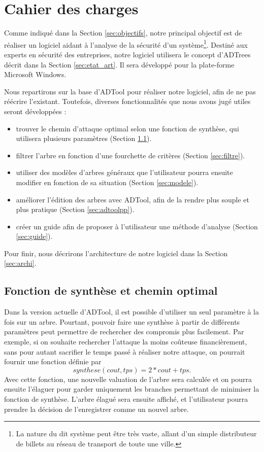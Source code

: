 \section{Cahier des charges}
    \label{sec:cahier}

    Comme indiqué dans la Section \ref{sec:objectifs}, notre principal objectif est de réaliser un logiciel aidant à l'analyse de la sécurité d'un système\footnote{La nature du dit système peut être très vaste, allant d'un simple distributeur de billets au réseau de transport de toute une ville.}. Destiné aux experts en sécurité des entreprises, notre logiciel utilisera le concept d'ADTrees décrit dans la Section \ref{sec:etat_art}. Il sera développé pour la plate-forme Microsoft Windows.

    Nous repartirons sur la base d'ADTool pour réaliser notre logiciel, afin de ne pas réécrire l'existant. Toutefois, diverses fonctionnalités que nous avons jugé utiles seront développées :
    \begin{itemize}
        \item trouver le chemin d'attaque optimal selon une fonction de synthèse, qui utilisera plusieurs paramètres (Section \ref{sec:fct_synth}).
        \item filtrer l'arbre en fonction d'une fourchette de critères (Section \ref{sec:filtre}).
        \item utiliser des modèles d'arbres généraux que l'utilisateur pourra ensuite modifier en fonction de sa situation (Section \ref{sec:modele}).
        \item améliorer l'édition des arbres avec ADTool, afin de la rendre plus souple et plus pratique (Section \ref{sec:adtoolpp}).
        \item créer un guide afin de proposer à l'utilisateur une méthode d'analyse (Section \ref{sec:guide}).
    \end{itemize}

    Pour finir, nous décrirons l'architecture de notre logiciel dans la Section \ref{sec:archi}.

    \subsection{Fonction de synthèse et chemin optimal}
        \label{sec:fct_synth}

        Dans la version actuelle d'ADTool, il est possible d'utiliser un seul paramètre à la fois sur un arbre. Pourtant, pouvoir faire une synthèse à partir de différents paramètres peut permettre de rechercher des compromis plus facilement.
        Par exemple, si on souhaite rechercher l'attaque la moins coûteuse financièrement, sans pour autant sacrifier le temps passé à réaliser notre attaque, on pourrait fournir une fonction définie par \[ synthese(cout, tps) = 2*cout + tps . \]
        Avec cette fonction, une nouvelle valuation de l'arbre sera calculée et on pourra ensuite l'élaguer pour garder uniquement les branches permettant de minimiser la fonction de synthèse.
        L'arbre élagué sera ensuite affiché, et l'utilisateur pourra prendre la décision de l'enregistrer comme un nouvel arbre.

